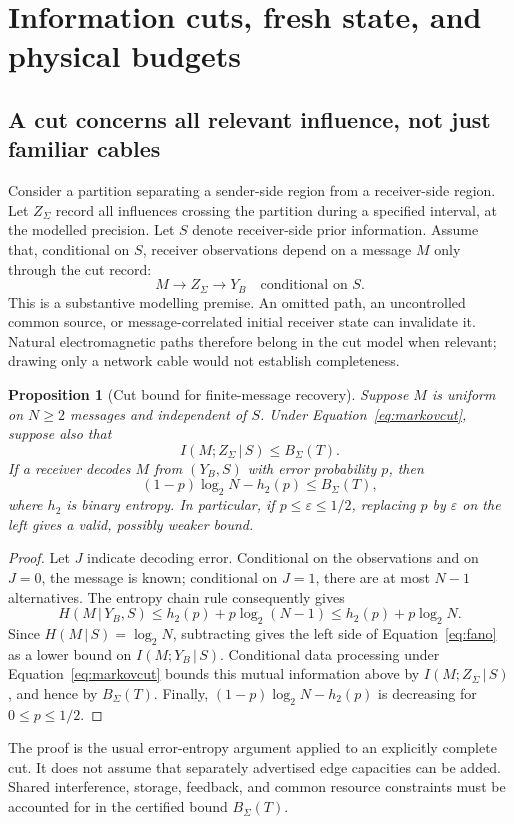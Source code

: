 \documentclass[11pt,a4paper]{article}
\newtheorem{proposition}[theorem]{Proposition}
\theoremstyle{definition}
\theoremstyle{remark}
\newcommand{\given}{\,\vert\,}
\begin{document}
\section{Information cuts, fresh state, and physical budgets}\label{sec:cuts}
\subsection{A cut concerns all relevant influence, not just familiar cables}
Consider a partition separating a sender-side region from a receiver-side region. Let $Z_\Sigma$ record all influences crossing the partition during a specified interval, at the modelled precision. Let $S$ denote receiver-side prior information. Assume that, conditional on $S$, receiver observations depend on a message $M$ only through the cut record:
\begin{equation}\label{eq:markovcut}
 M\longrightarrow Z_\Sigma\longrightarrow Y_B
 \quad\text{conditional on }S.
\end{equation}
This is a substantive modelling premise. An omitted path, an uncontrolled common source, or message-correlated initial receiver state can invalidate it. Natural electromagnetic paths therefore belong in the cut model when relevant; drawing only a network cable would not establish completeness.

\begin{proposition}[Cut bound for finite-message recovery]\label{prop:cut}
Suppose $M$ is uniform on $N\geq2$ messages and independent of $S$. Under Equation~\eqref{eq:markovcut}, suppose also that
\[
 I(M;Z_\Sigma\given S)\leq B_\Sigma(T).
\]
If a receiver decodes $M$ from $(Y_B,S)$ with error probability $p$, then
\begin{equation}\label{eq:fano}
 (1-p)\log_2N-h_2(p)\leq B_\Sigma(T),
\end{equation}
where $h_2$ is binary entropy. In particular, if $p\leq\varepsilon\leq1/2$, replacing $p$ by $\varepsilon$ on the left gives a valid, possibly weaker bound.
\end{proposition}
\begin{proof}
Let $J$ indicate decoding error. Conditional on the observations and on $J=0$, the message is known; conditional on $J=1$, there are at most $N-1$ alternatives. The entropy chain rule consequently gives
\[
 H(M\given Y_B,S)\leq h_2(p)+p\log_2(N-1)
 \leq h_2(p)+p\log_2N.
\]
Since $H(M\given S)=\log_2N$, subtracting gives the left side of Equation~\eqref{eq:fano} as a lower bound on $I(M;Y_B\given S)$. Conditional data processing under Equation~\eqref{eq:markovcut} bounds this mutual information above by $I(M;Z_\Sigma\given S)$, and hence by $B_\Sigma(T)$. Finally, $(1-p)\log_2N-h_2(p)$ is decreasing for $0\leq p\leq1/2$.
\end{proof}
The proof is the usual error-entropy argument applied to an explicitly complete cut. It does not assume that separately advertised edge capacities can be added. Shared interference, storage, feedback, and common resource constraints must be accounted for in the certified bound $B_\Sigma(T)$.
\end{document}
